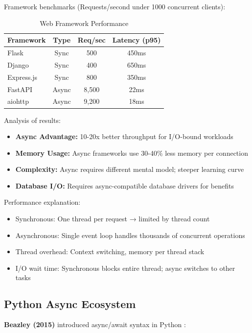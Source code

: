 \documentclass[conference]{IEEEtran}
\begin{document}
Framework benchmarks (Requests/second under 1000 concurrent clients):

\begin{table}[h]
\centering
\caption{Web Framework Performance}
\begin{tabular}{|l|c|c|c|}
\hline
\textbf{Framework} & \textbf{Type} & \textbf{Req/sec} & \textbf{Latency (p95)} \\
\hline
Flask & Sync & 500 & 450ms \\
Django & Sync & 400 & 650ms \\
Express.js & Sync & 800 & 350ms \\
FastAPI & Async & 8,500 & 22ms \\
aiohttp & Async & 9,200 & 18ms \\
\hline
\end{tabular}
\end{table}

Analysis of results:
\begin{itemize}
    \item \textbf{Async Advantage:} 10-20x better throughput for I/O-bound workloads
    \item \textbf{Memory Usage:} Async frameworks use 30-40\% less memory per connection
    \item \textbf{Complexity:} Async requires different mental model; steeper learning curve
    \item \textbf{Database I/O:} Requires async-compatible database drivers for benefits
\end{itemize}

Performance explanation:
\begin{itemize}
    \item Synchronous: One thread per request → limited by thread count
    \item Asynchronous: Single event loop handles thousands of concurrent operations
    \item Thread overhead: Context switching, memory per thread stack
    \item I/O wait time: Synchronous blocks entire thread; async switches to other tasks
\end{itemize}

\subsection{Python Async Ecosystem}

\textbf{Beazley (2015)} introduced async/await syntax in Python \cite{beazley2015python}:
\end{document}
